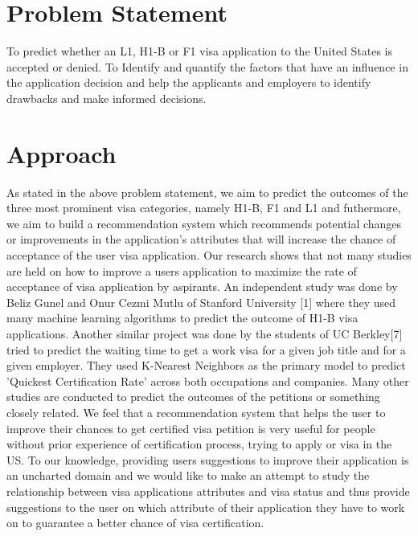 \documentclass[conference]{IEEEtran}
\begin{document}
\section{Problem Statement}
To predict whether an L1, H1-B or F1 visa application to the United States is accepted or denied. 
To Identify and quantify the factors that have an influence in the application decision and  help the applicants and employers to identify drawbacks and make informed decisions.

\section{Approach}
As stated in the above problem statement, we aim to predict the outcomes of the three most prominent visa categories, namely H1-B, F1 and L1 and futhermore, we aim to build a recommendation system which recommends potential changes or improvements in the application's attributes that will increase the chance of acceptance of the user visa application. 
Our research shows that not many studies are held on how to improve a users application to maximize the rate of acceptance of visa application by aspirants. An independent study was done by Beliz Gunel and Onur Cezmi Mutlu of Stanford University [1] where they used many machine learning algorithms to predict the outcome of H1-B visa applications. Another similar project was done by the students of UC Berkley[7] tried
to predict the waiting time to get a work visa for a
given job title and for a given employer. They used
K-Nearest Neighbors as the primary model to predict
’Quickest Certification Rate’ across both occupations
and companies. Many other studies are conducted to predict the outcomes of the petitions or something closely related.
We feel that a recommendation system that helps the user to improve their chances to get certified visa petition is very useful for people without prior experience of certification process, trying to apply or visa in the US. To our knowledge, providing users suggestions to improve their application is an uncharted domain and we would like to make an attempt to study the relationship between visa applications attributes and visa status and thus provide suggestions to the user on which attribute of their application they have to work on to guarantee a better chance of visa certification.
\end{document}
